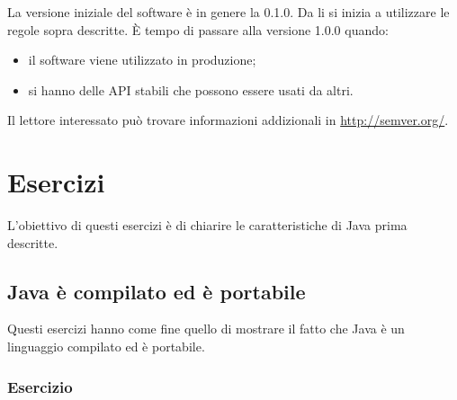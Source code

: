 \documentclass{article}
\theoremstyle{definition}
\begin{document}
La versione iniziale del software \`e in genere la 0.1.0. Da li si inizia a utilizzare le regole sopra descritte.
\`E tempo di passare alla versione 1.0.0 quando:
\begin{itemize}
\item il software viene utilizzato in produzione;
\item si hanno delle API stabili che possono essere usati da altri.
\end{itemize}


Il lettore interessato pu\`o trovare informazioni addizionali in \url{http://semver.org/}.

\section{Esercizi}
L'obiettivo di questi esercizi \`e di chiarire le caratteristiche di Java prima descritte.

\subsection{Java \`e compilato ed \`e portabile}
Questi esercizi hanno come fine quello di mostrare il fatto che Java \`e un linguaggio compilato ed \`e portabile. 

\subsubsection{Esercizio}
\end{document}
